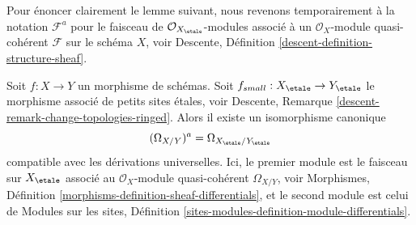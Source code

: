\medskip\noindent
Pour énoncer clairement le lemme suivant, nous revenons temporairement
à la notation $\mathcal{F}^a$ pour le faisceau de $\mathcal{O}_{X_\etale}$-modules
associé à un $\mathcal{O}_X$-module quasi-cohérent $\mathcal{F}$
sur le schéma $X$, voir
Descente, Définition \ref{descent-definition-structure-sheaf}.

\begin{lemma}
\label{lemma-match-modules-differentials}
Soit $f : X \to Y$ un morphisme de schémas. Soit
$f_{small} : X_\etale \to Y_\etale$ le morphisme associé
de petits sites étales, voir
Descente, Remarque \ref{descent-remark-change-topologies-ringed}.
Alors il existe un isomorphisme canonique
$$
(\Omega_{X/Y})^a = \Omega_{X_\etale/Y_\etale}
$$
compatible avec les dérivations universelles. Ici, le premier module
est le faisceau sur $X_\etale$ associé
au $\mathcal{O}_X$-module quasi-cohérent $\Omega_{X/Y}$, voir
Morphismes, Définition \ref{morphisms-definition-sheaf-differentials},
et le second module est celui de
Modules sur les sites,
Définition \ref{sites-modules-definition-module-differentials}.
\end{lemma}


